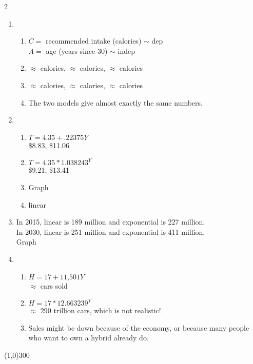 \begin{multicols} {2}
\begin{enumerate}
\item %
\begin{enumerate}
\item $C=$ recommended intake (calories) $\sim$ dep \\ $A=$ age (years since 30) $\sim$ indep 
\item $\approx$  calories, $\approx$  calories, $\approx$  calories
\item $\approx$  calories, $\approx$  calories, $\approx$  calories
\item The two models give almost exactly the same numbers.
\end{enumerate}

\item %
\begin{enumerate}
\item $T=4.35+.22375Y$ \\ \$8.83, \$11.06
\item $T=4.35\ast1.038243^Y$ \\ \$9.21, \$13.41
\item Graph
\item linear
\end{enumerate}

\item %
In 2015, linear is 189 million and exponential is 227 million. \\
In 2030, linear is 251 million and exponential is 411 million. \\
Graph

\item %
\begin{enumerate}
\item $H=17+\text{11,501}Y$ \\ $\approx$  cars sold
\item $H = 17 \ast 12.663239^Y$ \\ $\approx$ 290 trillion cars, which is not realistic!
\item Sales might be down because of the economy, or because many people who want to own a hybrid already do.
\end{enumerate}

\end{enumerate}
\end{multicols}

\begin{center}
\line(1,0){300} %
\end{center}

